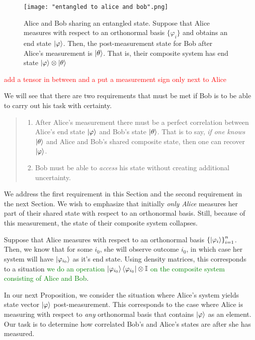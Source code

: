 \begin{figure}[h]
    \centering
    \texttt{[image: "entangled to alice and bob".png]}
    \caption{Alice and Bob sharing an entangled state. Suppose that Alice measures with respect to an orthonormal basis $\{\varphi_i\}$ and obtains an end state $\ket{\varphi}$.  Then, the post-measurement state for Bob after Alice's measurement is $\ket{\theta}$. That is, their composite system has end state $\ket{\varphi}\otimes\ket{\theta}$}
    \label{fig:entanglement}
\end{figure}
\textcolor{red}{add a tensor in between and a put a measurement sign only next to Alice}


We will see that there are two requirements that must be met if Bob is to be able to carry out his task with certainty.
\begin{quote}
\begin{enumerate} 
    \item After Alice's measurement there must be a perfect correlation between Alice's end state $\ket{\varphi}$ and Bob's state $\ket{\theta}$.  That is to say, {\emph{if one knows}} $\ket{\theta}$ and Alice and Bob's shared composite state, then one can recover $\ket{\varphi}$.
    \item Bob must be able to {\emph{access}} his state without creating additional uncertainty.
\end{enumerate}    
\end{quote}


We address the first requirement in this Section and the second requirement in the next Section.  We wish to emphasize that initially {\emph{only Alice}} measures her part of their shared state with respect to an orthonormal basis.  Still, because of this measurement, the state of their composite system collapses.  


Suppose that Alice measures with respect to an orthonormal basis ${\{\ket{\varphi_i}\}}_{i=1}^{n}$.  Then, we know that for some $i_0$, she will observe outcome $i_0$, in which case her system will have $\ket{\varphi_{i_0}}$ as it's end state. Using density matrices, this corresponds to a situation \textcolor{green}{we do an operation }
$\ket{\varphi_{i_0}}\bra{\varphi_{i_0}} \otimes \mathbb{I}$ \textcolor{green}{on the composite system consisting of Alice and Bob}.  

In our next Proposition, we consider the situation where Alice's system yields state vector $\ket{\varphi}$ post-measurement.  This corresponds to the case where Alice is measuring with respect to {\emph{any}} orthonormal basis that contains $\ket{\varphi}$ as an element. Our task is to determine how correlated Bob's and Alice's states are after she has measured.  


